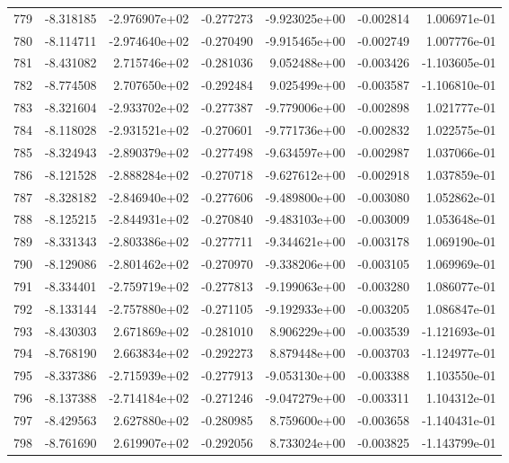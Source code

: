 \begin{tabular}{rrrrrrr}
 779 &  -8.318185 & -2.976907e+02 & -0.277273 & -9.923025e+00 &   -0.002814 &  1.006971e-01 \\
 780 &  -8.114711 & -2.974640e+02 & -0.270490 & -9.915465e+00 &   -0.002749 &  1.007776e-01 \\
 781 &  -8.431082 &  2.715746e+02 & -0.281036 &  9.052488e+00 &   -0.003426 & -1.103605e-01 \\
 782 &  -8.774508 &  2.707650e+02 & -0.292484 &  9.025499e+00 &   -0.003587 & -1.106810e-01 \\
 783 &  -8.321604 & -2.933702e+02 & -0.277387 & -9.779006e+00 &   -0.002898 &  1.021777e-01 \\
 784 &  -8.118028 & -2.931521e+02 & -0.270601 & -9.771736e+00 &   -0.002832 &  1.022575e-01 \\
 785 &  -8.324943 & -2.890379e+02 & -0.277498 & -9.634597e+00 &   -0.002987 &  1.037066e-01 \\
 786 &  -8.121528 & -2.888284e+02 & -0.270718 & -9.627612e+00 &   -0.002918 &  1.037859e-01 \\
 787 &  -8.328182 & -2.846940e+02 & -0.277606 & -9.489800e+00 &   -0.003080 &  1.052862e-01 \\
 788 &  -8.125215 & -2.844931e+02 & -0.270840 & -9.483103e+00 &   -0.003009 &  1.053648e-01 \\
 789 &  -8.331343 & -2.803386e+02 & -0.277711 & -9.344621e+00 &   -0.003178 &  1.069190e-01 \\
 790 &  -8.129086 & -2.801462e+02 & -0.270970 & -9.338206e+00 &   -0.003105 &  1.069969e-01 \\
 791 &  -8.334401 & -2.759719e+02 & -0.277813 & -9.199063e+00 &   -0.003280 &  1.086077e-01 \\
 792 &  -8.133144 & -2.757880e+02 & -0.271105 & -9.192933e+00 &   -0.003205 &  1.086847e-01 \\
 793 &  -8.430303 &  2.671869e+02 & -0.281010 &  8.906229e+00 &   -0.003539 & -1.121693e-01 \\
 794 &  -8.768190 &  2.663834e+02 & -0.292273 &  8.879448e+00 &   -0.003703 & -1.124977e-01 \\
 795 &  -8.337386 & -2.715939e+02 & -0.277913 & -9.053130e+00 &   -0.003388 &  1.103550e-01 \\
 796 &  -8.137388 & -2.714184e+02 & -0.271246 & -9.047279e+00 &   -0.003311 &  1.104312e-01 \\
 797 &  -8.429563 &  2.627880e+02 & -0.280985 &  8.759600e+00 &   -0.003658 & -1.140431e-01 \\
 798 &  -8.761690 &  2.619907e+02 & -0.292056 &  8.733024e+00 &   -0.003825 & -1.143799e-01 \\

\end{tabular}
